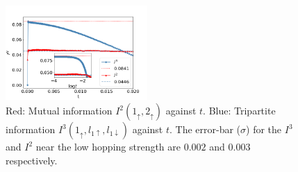 \documentclass{iopart}
\begin{document}
\begin{figure}[!htpb]
\centering
\includegraphics[width=0.48\textwidth]{I3I2AI.png}
\caption{Red: Mutual information $I^2(1_{\uparrow},2_{\uparrow})$ against \(t\). Blue: Tripartite information $I^3(1_{\uparrow},l_{1\uparrow},l_{1\downarrow})$ against \(t\). The error-bar ($\sigma$) for the $I^3$ and $I^2$ near the low hopping strength are $0.002$ and $0.003$ respectively.}
\label{fig:I3_I2_two_channel}
\end{figure}
\end{document}
